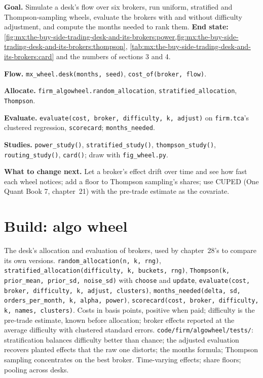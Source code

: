 \begin{tutorial}
\textbf{Goal.} Simulate a desk's flow over six brokers, run uniform, stratified and Thompson-sampling wheels, evaluate the brokers with and without
difficulty adjustment, and compute the months needed to rank them.
\textbf{End state:} \cref{fig:mx:the-buy-side-trading-desk-and-its-brokers:power,fig:mx:the-buy-side-trading-desk-and-its-brokers:thompson},
\cref{tab:mx:the-buy-side-trading-desk-and-its-brokers:card} and the numbers of sections 3 and 4.
\begin{tutsteps}
\item \textbf{Flow.} \texttt{mx\_wheel.desk(months, seed)}, \texttt{cost\_of(broker, flow)}.
\item \textbf{Allocate.} \texttt{firm\_algowheel.random\_allocation}, \texttt{stratified\_allocation}, \texttt{Thompson}.
\item \textbf{Evaluate.} \texttt{evaluate(cost, broker, difficulty, k, adjust)} on \texttt{firm.tca}'s clustered regression, \texttt{scorecard};
\texttt{months\_needed}.
\item \textbf{Studies.} \texttt{power\_study()}, \texttt{stratified\_study()}, \texttt{thompson\_study()}, \texttt{routing\_study()}, \texttt{card()};
draw with \texttt{fig\_wheel.py}.
\end{tutsteps}
\textbf{What to change next.} Let a broker's effect drift over time and see how fast each wheel notices; add a floor to Thompson sampling's shares;
use CUPED (One Quant Book 7, chapter~21) with the pre-trade estimate as the covariate.
\end{tutorial}

\section{Build: algo wheel}\label{bld:mx:the-buy-side-trading-desk-and-its-brokers:algowheel}

\begin{build}
 The desk's allocation and evaluation of brokers, used by chapter~28's  to compare its own versions.
 \texttt{random\_allocation(n, k, rng)}, \texttt{stratified\_allocation(difficulty, k, buckets, rng)}, \texttt{Thompson(k,
prior\_mean, prior\_sd, noise\_sd)} with \texttt{choose} and \texttt{update}, \texttt{evaluate(cost, broker, difficulty, k, adjust, clusters)},
\texttt{months\_needed(delta, sd, orders\_per\_month, k, alpha, power)}, \texttt{scorecard(cost, broker, difficulty, k, names, clusters)}.
 Costs in basis points, positive when paid; difficulty is the pre-trade estimate, known before allocation; broker effects reported at the
average difficulty with clustered standard errors.
 \texttt{code/firm/algowheel/tests/}: stratification balances difficulty better than chance; the adjusted evaluation recovers
planted effects that the raw one distorts; the months formula; Thompson sampling concentrates on the best broker.
 Time-varying effects; share floors; pooling across desks.
\end{build}

